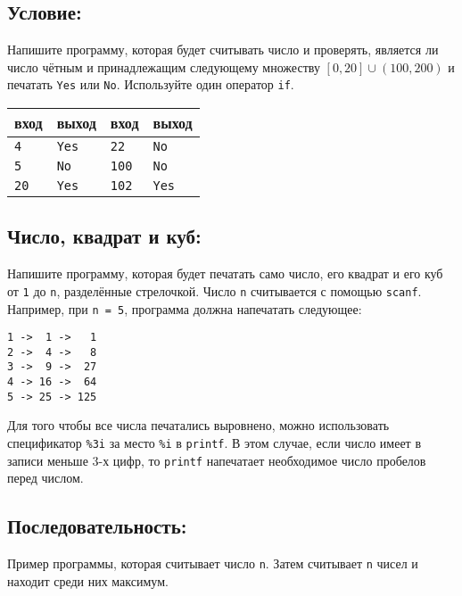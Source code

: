 \documentclass{article}
\begin{document}
\subsection{Условие:} 
Напишите программу, которая будет считывать число и проверять, является ли число чётным и принадлежащим следующему множеству 
$[0, 20] \cup (100, 200)$ и печатать \texttt{Yes} или \texttt{No}. Используйте один оператор \texttt{if}.

\begin{center}
\begin{tabular}{ l l | l l }
 вход & выход & вход & выход \\ \hline
 \texttt{4} & \texttt{Yes} & \texttt{22} & \texttt{No}   \\ 
 \texttt{5} & \texttt{No} &\texttt{100} & \texttt{No}  \\ 
 \texttt{20} & \texttt{Yes} & \texttt{102} & \texttt{Yes} \\ 
\end{tabular}
\end{center}


\subsection{Число, квадрат и куб:} 
Напишите программу, которая будет печатать само число, его квадрат и его куб от \texttt{1} до \texttt{n}, разделённые стрелочкой.
Число \texttt{n} считывается с помощью \texttt{scanf}. 
Например, при \texttt{n = 5}, программа должна напечатать следующее:
\begin{verbatim}
1 ->  1 ->   1
2 ->  4 ->   8
3 ->  9 ->  27
4 -> 16 ->  64
5 -> 25 -> 125
\end{verbatim}
Для того чтобы все числа печатались выровнено, можно использовать спецификатор \texttt{\%3i} за место \texttt{\%i} в \texttt{printf}. В этом случае, если число имеет в записи меньше 3-х цифр, то \texttt{printf} напечатает необходимое число пробелов перед числом.



\subsection{Последовательность:} 
Пример программы, которая считывает число \texttt{n}. Затем считывает \texttt{n} чисел и находит среди них максимум. 
\end{document}
